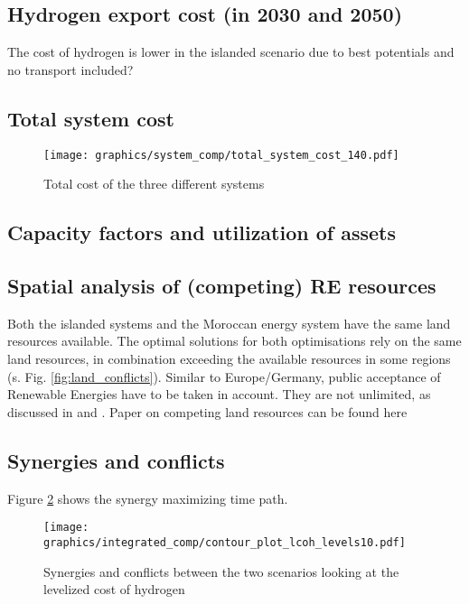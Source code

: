 \subsection{Hydrogen export cost (in 2030 and 2050)}


The cost of hydrogen is lower in the islanded scenario due to best potentials and no transport included?


\subsection{Total system cost}

\begin{figure}[h!]
    \centering
    \texttt{[image: graphics/system\_comp/total\_system\_cost\_140.pdf]}
    \caption{Total cost of the three different systems}
    \label{fig:total_system_cost}
\end{figure}

\subsection{Capacity factors and utilization of assets}

\subsection{Spatial analysis of (competing) RE resources}
Both the islanded systems and the Moroccan energy system have the same land resources available. 
The optimal solutions for both optimisations rely on the same land resources, in combination exceeding the 
available resources in some regions (s. Fig. \ref{fig:land_conflicts}). 
Similar to Europe/Germany, public acceptance of Renewable Energies have to be taken in account. 
They are not unlimited, as discussed in \cite{Hanger2016} and \cite{TerraponPfaff2019}.
Paper on competing land resources can be found here \cite{Patankar2022}



\subsection{Synergies and conflicts}
Figure \ref{fig:contour_plot} shows the synergy maximizing time path.

\begin{figure}[h!]
    \centering
    \texttt{[image: graphics/integrated\_comp/contour\_plot\_lcoh\_levels10.pdf]}
    \caption{Synergies and conflicts between the two scenarios looking at the levelized cost of hydrogen}
    \label{fig:contour_plot}
\end{figure}

